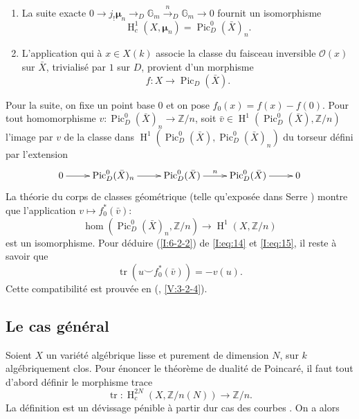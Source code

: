 \documentclass{book}
\DeclareMathOperator{\h}{H}
\DeclareMathOperator{\pic}{Pic}
\DeclareMathOperator{\tr}{tr}
\newcommand{\cO}{\mathcal{O}}
\newcommand{\dG}{\mathbb{G}}
\newcommand{\dmu}{{\bm\mu}}%
\newcommand{\dZ}{\mathbb{Z}}
\begin{document}
\begin{enumerate}[\indent a)]
  \item La suite exacte 
    $0\to j_!\dmu_n \to _D\dG_m \xrightarrow{n} _D\dG_m\to 0$ fournit un 
    isomorphisme 
    \begin{equation}\label{I:eq:14}
      \h_c^1(X,\dmu_n) = \pic_D^0(\bar X)_n \text{.}
    \end{equation}
  \item L'application qui à $x\in X(k)$ associe la classe du faisceau 
    inversible $\cO(x)$ sur $\bar X$, trivialisé par $1$ sur $D$, provient 
    d'un morphisme 
    \[
      f:X \to \pic_D(\bar X) \text{.}
    \]
\end{enumerate}
Pour la suite, on fixe un point base $0$ et on pose $f_0(x)=f(x)-f(0)$. Pour 
tout homomorphisme $v:\pic_D^0(\bar X)_n \to \dZ/n$, soit 
$\bar v\in \h^1\left(\pic_D^0(\bar X),\dZ/n\right)$ l'image par $v$ de la classe 
dans $\h^1\left(\pic_D^0(\bar X),\pic_D^0(\bar X)_n\right)$ du torseur défini 
par l'extension 
\[\xymatrix{
  0 \ar[r] 
    & \pic_D^0(\bar X)_n \ar[r] 
    & \pic_D^0(\bar X) \ar[r]^-n 
    & \pic_D^0(\bar X) \ar[r] 
    & 0
}\]
La théorie du corps de classes géométrique (telle qu'exposée dans 
Serre \cite{15}) montre que l'application $v\mapsto f_0^*(\bar v)$: 
\begin{equation}\label{I:eq:15}
  \hom\left(\pic_D^0(\bar X)_n,\dZ/n\right) \to \h^1(X,\dZ/n)
\end{equation}
est un isomorphisme. Pour déduire (\ref{I:6-2-2}) de \eqref{I:eq:14} et 
\eqref{I:eq:15}, il reste à savoir que 
\begin{equation}\label{I:eq:16} %
  \tr\left(u \smallsmile f_0^*(\bar v)\right) = -v(u) \text{.}
\end{equation}
Cette compatibilité est prouvée en (, \ref{V:3-2-4}). 










\subsection{Le cas général}\label{I:6-3}

Soient $X$ un variété algébrique lisse et purement de dimension $N$, sur 
$k$ algébriquement clos. Pour énoncer le théorème de dualité de 
Poincaré, il faut tout d'abord définir le morphisme trace 
\[
  \tr : \h_c^{2N}\left(X,\dZ/n(N)\right) \to \dZ/n\text{.}
\]
La définition est un dévissage pénible à partir dur cas des courbes 
\cite[XVIII \S 2]{4}. On a alors 
\end{document}
